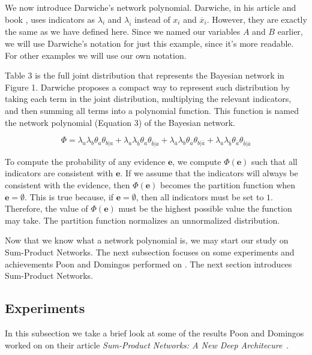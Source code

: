 \documentclass[a4paper,10pt]{article}
\theoremstyle{plain}
\begin{document}
We now introduce Darwiche's network polynomial. Darwiche, in his article and book
\cite{diff-approach-darwiche,bayes-net-darwiche}, uses indicators as $\lambda_i$ and
$\lambda_{\overline{i}}$ instead of $x_i$ and $\overline{x}_i$. However, they are exactly the same
as we have defined here. Since we named our variables $A$ and $B$ earlier, we will use Darwiche's
notation for just this example, since it's more readable. For other examples we will use our own
notation.

Table 3 is the full joint distribution that represents the Bayesian network in Figure 1. Darwiche
proposes a compact way to represent such distribution by taking each term in the joint
distribution, multiplying the relevant indicators, and then summing all terms into a polynomial
function. This function is named the network polynomial (Equation 3) of the Bayesian network.

\begin{equation}
  \Phi = \lambda_a\lambda_b\theta_a\theta_{b|a} +
      \lambda_a\lambda_{\overline{b}}\theta_a\theta_{\overline{b}|a} +
      \lambda_{\overline{a}}\lambda_b\theta_{\overline{a}}\theta_{b|\overline{a}} +
      \lambda_{\overline{a}}\lambda_{\overline{b}}\theta_{\overline{a}}\theta_{\overline{b}|\overline{a}}
\end{equation}

To compute the probability of any evidence $\mathbf{e}$, we compute $\Phi(\mathbf{e})$ such that
all indicators are consistent with $\mathbf{e}$. If we assume that the indicators will always be
consistent with the evidence, then $\Phi(\mathbf{e})$ becomes the partition function when
$\mathbf{e}=\emptyset$. This is true because, if $\mathbf{e}=\emptyset$, then all indicators must
be set to $1$. Therefore, the value of $\Phi(\mathbf{e})$ must be the highest possible value the
function may take. The partition function normalizes an unnormalized distribution.

Now that we know what a network polynomial is, we may start our study on Sum-Product Networks.
The next subsection focuses on some experiments and achievements Poon and Domingos performed on
\cite{poon-domingos}. The next section introduces Sum-Product Networks.

\subsection{Experiments}

In this subsection we take a brief look at some of the results Poon and Domingos worked on on their
article \textit{Sum-Product Networks: A New Deep Architecure}~\cite{poon-domingos}.
\end{document}
